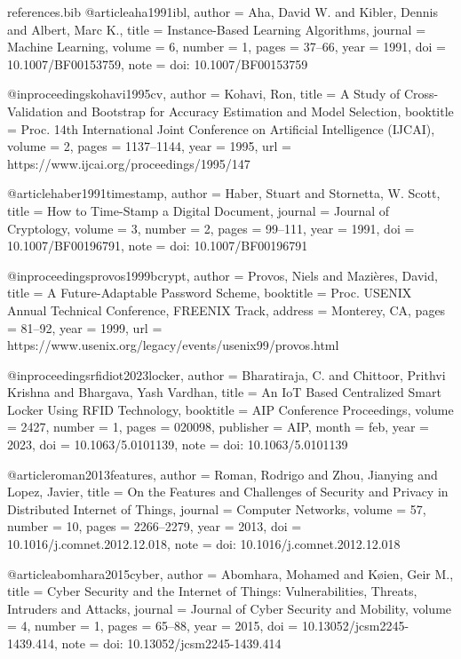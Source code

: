 \begin{filecontents*}[overwrite]{references.bib}
@article{aha1991ibl,
  author  = {Aha, David W. and Kibler, Dennis and Albert, Marc K.},
  title   = {Instance-Based Learning Algorithms},
  journal = {Machine Learning},
  volume  = {6},
  number  = {1},
  pages   = {37--66},
  year    = {1991},
  doi     = {10.1007/BF00153759},
  note    = {doi: 10.1007/BF00153759}
}

@inproceedings{kohavi1995cv,
  author    = {Kohavi, Ron},
  title     = {A Study of Cross-Validation and Bootstrap for Accuracy Estimation and Model Selection},
  booktitle = {Proc. 14th International Joint Conference on Artificial Intelligence (IJCAI)},
  volume    = {2},
  pages     = {1137--1144},
  year      = {1995},
  url       = {https://www.ijcai.org/proceedings/1995/147}
}

@article{haber1991timestamp,
  author  = {Haber, Stuart and Stornetta, W. Scott},
  title   = {How to Time-Stamp a Digital Document},
  journal = {Journal of Cryptology},
  volume  = {3},
  number  = {2},
  pages   = {99--111},
  year    = {1991},
  doi     = {10.1007/BF00196791},
  note    = {doi: 10.1007/BF00196791}
}

@inproceedings{provos1999bcrypt,
  author    = {Provos, Niels and Mazi{\`e}res, David},
  title     = {A Future-Adaptable Password Scheme},
  booktitle = {Proc. USENIX Annual Technical Conference, FREENIX Track},
  address   = {Monterey, CA},
  pages     = {81--92},
  year      = {1999},
  url       = {https://www.usenix.org/legacy/events/usenix99/provos.html}
}

@inproceedings{rfidiot2023locker,
  author    = {Bharatiraja, C. and Chittoor, Prithvi Krishna and Bhargava, Yash Vardhan},
  title     = {An {IoT} Based Centralized Smart Locker Using {RFID} Technology},
  booktitle = {AIP Conference Proceedings},
  volume    = {2427},
  number    = {1},
  pages     = {020098},
  publisher = {AIP},
  month     = feb,
  year      = {2023},
  doi       = {10.1063/5.0101139},
  note      = {doi: 10.1063/5.0101139}
}

@article{roman2013features,
  author  = {Roman, Rodrigo and Zhou, Jianying and Lopez, Javier},
  title   = {On the Features and Challenges of Security and Privacy in Distributed {Internet of Things}},
  journal = {Computer Networks},
  volume  = {57},
  number  = {10},
  pages   = {2266--2279},
  year    = {2013},
  doi     = {10.1016/j.comnet.2012.12.018},
  note    = {doi: 10.1016/j.comnet.2012.12.018}
}

@article{abomhara2015cyber,
  author  = {Abomhara, Mohamed and K{\o}ien, Geir M.},
  title   = {Cyber Security and the {Internet of Things}: Vulnerabilities, Threats, Intruders and Attacks},
  journal = {Journal of Cyber Security and Mobility},
  volume  = {4},
  number  = {1},
  pages   = {65--88},
  year    = {2015},
  doi     = {10.13052/jcsm2245-1439.414},
  note    = {doi: 10.13052/jcsm2245-1439.414}
}


\end{filecontents*}
